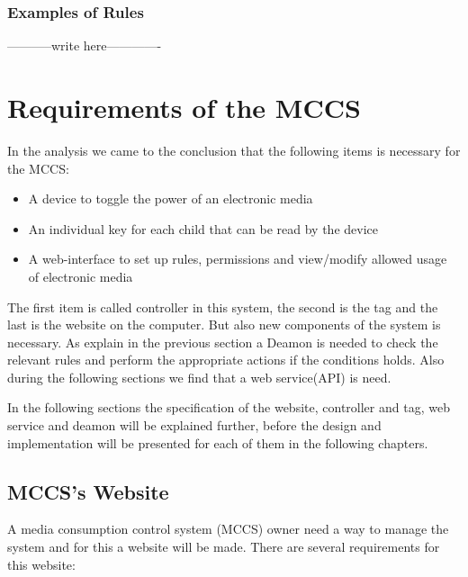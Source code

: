 \subsubsection{Examples of Rules}
-----------write here-------------


\section{Requirements of the MCCS}
\label{sec:RequirMCCS}

In the analysis we came to the conclusion that the following items is necessary for the MCCS: 
\begin{itemize}
	\item A device to toggle the power of an electronic media
	\item An individual key for each child that can be read by the device
	\item A web-interface to set up rules, permissions and view/modify allowed usage of electronic media
\end{itemize} 


The first item is called controller in this system, the second is the tag and the last is the website on the computer. But also new components of the system is necessary. As explain in the previous section a Deamon is needed to check the relevant rules and perform the appropriate actions if the conditions holds. Also during the following sections we find that a web service(API) is need. 

In the following sections the specification of the website, controller and tag, web service and deamon will be explained further, before the design and implementation will be presented for each of them in the following chapters.  

\subsection{MCCS's Website}
A media consumption control system (MCCS) owner need a way to manage the system and for this a website will be made. There are several requirements for this website:

